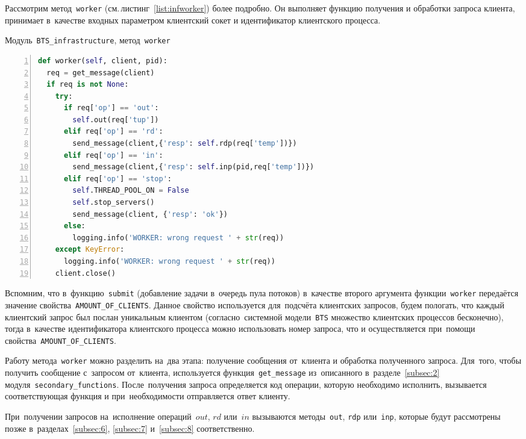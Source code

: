 Рассмотрим метод~\texttt{worker} (см.\,листинг~\ref{list:infworker}) более подробно. Он выполняет функцию получения и обработки запроса клиента, принимает в~качестве входных параметром клиентский сокет и идентификатор клиентского процесса.
\begin{ListingEnv}\caption{Модуль~\texttt{BTS\_infrastructure}, метод~\texttt{worker}}\label{list:infworker}
	\begin{lstlisting}[language=Python, numbers=left]
def worker(self, client, pid):
  req = get_message(client)
  if req is not None:
    try:
      if req['op'] == 'out':
        self.out(req['tup'])
      elif req['op'] == 'rd':
        send_message(client,{'resp': self.rdp(req['temp'])})
      elif req['op'] == 'in':
        send_message(client,{'resp': self.inp(pid,req['temp'])})
      elif req['op'] == 'stop':
        self.THREAD_POOL_ON = False
        self.stop_servers()
        send_message(client, {'resp': 'ok'})
      else:
        logging.info('WORKER: wrong request ' + str(req))
    except KeyError:
      logging.info('WORKER: wrong request ' + str(req))
    client.close()
	\end{lstlisting}
\end{ListingEnv}
Вспомним, что в~функцию~\texttt{submit} (добавление задачи в~очередь пула потоков) в~качестве второго аргумента функции~\texttt{worker} передаётся значение свойства~\texttt{AMOUNT_OF_CLIENTS}. Данное свойство используется для~подсчёта клиентских запросов, будем пологать, что каждый клиентский запрос был послан уникальным клиентом (согласно~системной модели~\texttt{BTS} множество клиентских процессов бесконечно), тогда в~качестве идентификатора клиентского процесса можно использовать номер запроса, что и осуществляется при~помощи свойства~\texttt{AMOUNT_OF_CLIENTS}.

Работу метода~\texttt{worker} можно разделить на~два этапа: получение сообщения от~клиента и обработка полученного запроса. Для~того, чтобы получить сообщение с~запросом от~клиента, используется функция~\texttt{get_message} из~описанного в~разделе~\ref{subsec:2} модуля~\texttt{secondary\_functions}. После~получения запроса определяется код операции, которую необходимо исполнить, вызывается соответствующая функция и при~необходимости отправляется ответ клиенту.

При~получении запросов на~исполнение операций~$out$, $rd$ или~$in$ вызываются методы~\texttt{out}, \texttt{rdp} или~\texttt{inp}, которые будут рассмотрены позже в~разделах~\ref{subsec:6}, \ref{subsec:7} и~\ref{subsec:8} соответственно.

